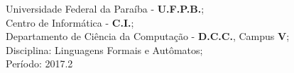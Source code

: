 \documentclass[11pt, a4paper]{article}
\begin{document}

	\begin{titlepage}

		\BgThispage

    	\begin{center}

	        {\sc \Large Universidade Federal da Paraíba - \textbf{U.F.P.B.}; \\
    	        Centro de Informática - \textbf{C.I.}; \\
        	    Departamento de Ciência da Computação - \textbf{D.C.C.}, Campus \textbf{V}; \\
            	Disciplina: Linguagens Formais e Autômatos; \\
	            Período: 2017.2 \\}

        	\vspace{1cm}


\end{center}
\end{titlepage}
\end{document}

